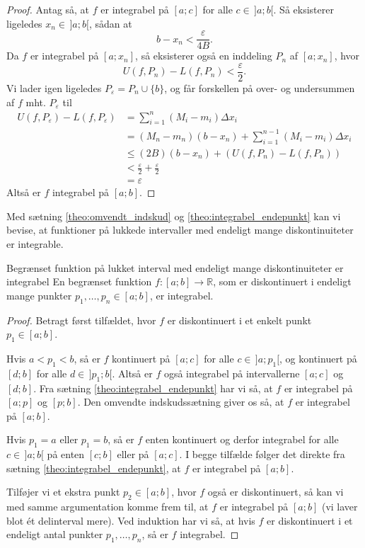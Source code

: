 \begin{proof}
  Antag så, at $f$ er integrabel på $[a;c]$ for alle $c \in \,]a;b[$.
  Så eksisterer ligeledes $x_n \in \,]a;b[$, sådan at
  \[
  b-x_n < \frac{\varepsilon }{4 B}. 
  \] 
  Da $f$ er integrabel på $[a;x_n]$, så eksisterer også en inddeling $P_n$ af $[a;x_n]$, hvor
  \[
  U(f, P_n)-L(f, P_n) < \frac{\varepsilon }{2}. 
  \] 
  Vi lader igen ligeledes $P _{\varepsilon }=P_n \cup \{ b \} $, og får forskellen på over- og undersummen af $f$ mht. $P _{\varepsilon }$ til
  \begin{equation*}
  \begin{split}
  U(f, P_{\varepsilon })-L(f, P_{\varepsilon })&= \sum_{i  =1}^{n} (M_i - m_i) \Delta x_i \\
    &=(M_n-m_n)(b-x_n) + \sum_{i =1}^{n-1} (M_i - m_i) \Delta x_i \\
    &\leq \left(2 B\right) (b-x_n) +(U(f, P_n)-L(f, P_n)) \\
    &<\frac{\varepsilon }{2} + \frac{\varepsilon }{2}\\
    &=\varepsilon 
  \end{split}
  \end{equation*}
  Altså er $f$ integrabel på $[a;b]$.
\end{proof}

Med sætning \ref{theo:omvendt_indskud} og \ref{theo:integrabel_endepunkt} kan vi bevise, at funktioner på lukkede intervaller med endeligt mange diskontinuiteter er integrable.

\begin{theorem}[label=theo:endelig_diskontinuiert_integrabel]{Begrænset funktion på lukket interval med endeligt mange diskontinuiteter er integrabel}{}
  En begrænset funktion $f:[a;b] \to \mathbb{R}$, som er diskontinuert i endeligt mange punkter $p_1, \ldots , p_n \in [a;b]$, er integrabel.
\end{theorem}
\begin{proof} 
  Betragt først tilfældet, hvor $f$ er diskontinuert i et enkelt punkt $p_1 \in [a;b]$. 

  Hvis $a<p_1<b$, så er $f$ kontinuert på $[a;c]$ for alle $c \in \, ]a;p_1[$, og kontinuert på $[d;b]$ for alle $d \in\, ]p_1;b[$.
  Altså er $f$ også integrabel på intervallerne $[a;c]$ og $[d;b]$.
  Fra sætning \ref{theo:integrabel_endepunkt} har vi så, at $f$ er integrabel på $[a;p]$ og $[p;b]$. 
  Den omvendte indskudssætning giver os så, at $f$ er integrabel på $[a;b]$. 

  Hvis $p_1=a$ eller $p_1=b$, så er $f$ enten kontinuert og derfor integrabel for alle $c \in \, ]a;b[$ på enten $[c;b]$ eller på $[a;c]$.
  I begge tilfælde følger det direkte fra sætning \ref{theo:integrabel_endepunkt}, at $f$ er integrabel på $[a;b]$. 
  
  Tilføjer vi et ekstra punkt $p_2 \in [a;b]$, hvor $f$ også er diskontinuert, så kan vi med samme argumentation komme frem til, at $f$ er integrabel på $[a;b]$ (vi laver blot ét delinterval mere).
Ved induktion har vi så, at hvis $f$ er diskontinuert i et endeligt antal punkter $p_1, \ldots , p_n$, så er $f$ integrabel. 
\end{proof}

